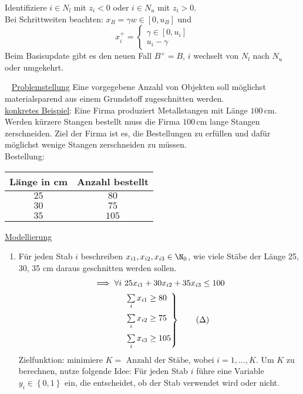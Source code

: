 Identifiziere $i \in N_{l}$ mit $z_{i} <0 $ oder $ i\in N_{u}$ mit $z_{i}> 0$.\\
Bei Schrittweiten beachten: $x_{B} = \gamma w \in [0,u_{B}]$ und
\begin{equation*}
	x_{i}^+ = \begin{cases}
	 \gamma \in [0,u_{i}]\\
	 u_{i}-\gamma
\end{cases}
\end{equation*}
Beim Basisupdate gibt es den neuen Fall $B^+ = B$, $i$ wechselt von $N_{l}$ nach $N_{u}$ oder umgekehrt.
\begin{beispiel}[Zuschnittsoptimierung]~\nl
  	\underline{Problemstellung} Eine vorgegebene Anzahl von Objekten soll möglichst materialsparend aus einem Grundstoff zugeschnitten werden.\\
  	\underline{konkretes Beispiel}: Eine Firma produziert Metallstangen mit Länge $100\,$cm. Werden kürzere Stangen bestellt muss die Firma $100\,$cm lange Stangen zerschneiden. Ziel der Firma ist es, die Bestellungen zu erfüllen und dafür möglichst wenige Stangen zerschneiden zu müssen.\\
  	Bestellung:
	\begin{table}[H]
		\centering
		\begin{tabular}{c|c}
			Länge in cm & Anzahl bestellt\\
      		\hline
      		$25$ & $80$ \\
      		$30$ & $75$ \\
      		$35$ & $105$ \\
  		\end{tabular}
	\end{table}
	\underline{Modellierung}
  \begin{enumerate}[label={Variante \arabic*.}]
    \item \label{item:Zuschnittsillymodel} Für jeden Stab $i$ beschreiben $x_{i1},x_{i2},x_{i3} \in \N_{0}$, wie viele Stäbe der Länge 25, 30, 35 cm daraus geschnitten werden sollen.
      \begin{align}
        \implies \forall i~ & 25x_{i1} + 30x_{i2} + 35x_{i3}\leq 100 \notag\\
                            &
        \begin{rcases}
          \sum\limits_{i}^{} x_{i1} \geq 80\\
          \sum\limits_{i}^{} x_{i2} \geq 75\\
          \sum\limits_{i}^{} x_{i3} \geq 105
        \end{rcases} \tag{$\Delta$}\label{model_cutting_1}
      \end{align}
      Zielfunktion: minimiere $K = \text{ Anzahl der Stäbe}$, wobei $i = 1,\dots ,K$.
      Um $K$ zu berechnen, nutze folgende Idee: Für jeden Stab $i$ führe eine Variable $y_{i} \in \left\{0,1 \right\}$ ein, die entscheidet, ob der Stab verwendet wird oder nicht.


\end{enumerate}
\end{beispiel}
